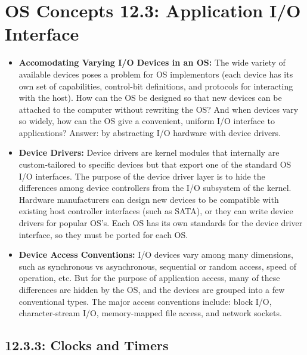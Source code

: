 \documentclass[12pt]{article}
\begin{document}
\section*{OS Concepts 12.3: Application I/O Interface}

\begin{itemize}
    \item \textbf{Accomodating Varying I/O Devices in an OS:} The wide variety of available devices poses a problem for OS implementors (each device has its own set of capabilities, control-bit definitions, and protocols for interacting with the host). How can the OS be designed so that new devices can be attached to the computer without rewriting the OS? And when devices vary so widely, how can the OS give a convenient, uniform I/O interface to applications? Answer: by abstracting I/O hardware with device drivers.
    \item \textbf{Device Drivers:} Device drivers are kernel modules that internally are custom-tailored to specific devices but that export one of the standard OS I/O interfaces. The purpose of the device driver layer is to hide the differences among device controllers from the I/O subsystem of the kernel. Hardware manufacturers can design new devices to be compatible with existing host controller interfaces (such as SATA), or they can write device drivers for popular OS's. Each OS has its own standards for the device driver interface, so they must be ported for each OS.
    \item \textbf{Device Access Conventions:} I/O devices vary among many dimensions, such as synchronous vs asynchronous, sequential or random access, speed of operation, etc. But for the purpose of application access, many of these differences are hidden by the OS, and the devices are grouped into a few conventional types. The major access conventions include: block I/O, character-stream I/O, memory-mapped file access, and network sockets.
\end{itemize}

\subsection*{12.3.3: Clocks and Timers}
\end{document}
